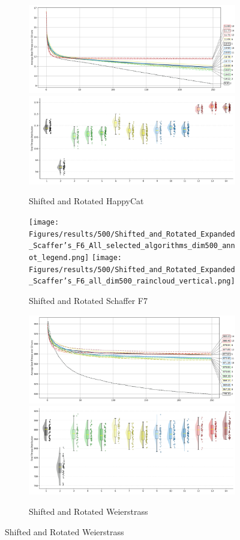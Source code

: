 \begin{figure}[p]
\begin{subfigure}{1\textwidth}
    \centering
    \includegraphics[width=.49\textwidth]{Figures/results/500/Shifted_and_Rotated_HappyCat_All_selected_algorithms_dim500_annot_legend.png}
    \includegraphics[width=.49\textwidth]{Figures/results/500/Shifted_and_Rotated_HappyCat_all_dim500_raincloud_vertical.png}
    \caption{Shifted and Rotated HappyCat}
\end{subfigure}

\begin{subfigure}{1\textwidth}
    \centering
    \texttt{[image: Figures/results/500/Shifted\_and\_Rotated\_Expanded\_Scaffer’s\_F6\_All\_selected\_algorithms\_dim500\_annot\_legend.png]}
    \texttt{[image: Figures/results/500/Shifted\_and\_Rotated\_Expanded\_Scaffer’s\_F6\_all\_dim500\_raincloud\_vertical.png]}
    \caption{Shifted and Rotated Schaffer F7}
\end{subfigure}

\begin{subfigure}{1\textwidth}
    \centering
    \includegraphics[width=.49\textwidth]{Figures/results/500/Shifted_and_Rotated_Weierstrass_All_selected_algorithms_dim500_annot_legend.png}
    \includegraphics[width=.49\textwidth]{Figures/results/500/Shifted_and_Rotated_Weierstrass_all_dim500_raincloud_vertical.png}
    \caption{Shifted and Rotated Weierstrass}
\end{subfigure}


\end{figure}
